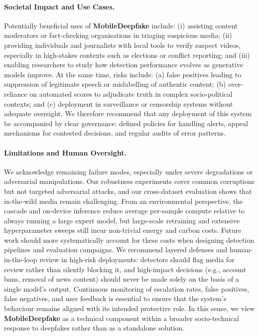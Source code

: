 \paragraph{Societal Impact and Use Cases.} Potentially beneficial uses of \textbf{MobileDeepfake} include: (i) assisting content moderators or fact\hyp checking organisations in triaging suspicious media; (ii) providing individuals and journalists with local tools to verify suspect videos, especially in high\hyp stakes contexts such as elections or conflict reporting; and (iii) enabling researchers to study how detection performance evolves as generative models improve. At the same time, risks include: (a) false positives leading to suppression of legitimate speech or mislabelling of authentic content; (b) over\hyp reliance on automated scores to adjudicate truth in complex socio\hyp political contexts; and (c) deployment in surveillance or censorship systems without adequate oversight. We therefore recommend that any deployment of this system be accompanied by clear governance: defined policies for handling alerts, appeal mechanisms for contested decisions, and regular audits of error patterns.

\paragraph{Limitations and Human Oversight.} We acknowledge remaining failure modes, especially under severe degradations or adversarial manipulations. Our robustness experiments cover common corruptions but not targeted adversarial attacks, and our cross\hyp dataset evaluation shows that in\hyp the\hyp wild media remain challenging. From an environmental perspective, the cascade and on\hyp device inference reduce average per\hyp sample compute relative to always running a large expert model, but large\hyp scale retraining and extensive hyperparameter sweeps still incur non\hyp trivial energy and carbon costs. Future work should more systematically account for these costs when designing detection pipelines and evaluation campaigns. We recommend layered defenses and human\hyp in\hyp the\hyp loop review in high\hyp risk deployments: detectors should flag media for review rather than silently blocking it, and high\hyp impact decisions (e.g., account bans, removal of news content) should never be made solely on the basis of a single model's output. Continuous monitoring of escalation rates, false positives, false negatives, and user feedback is essential to ensure that the system's behaviour remains aligned with its intended protective role. In this sense, we view \textbf{MobileDeepfake} as a technical component within a broader socio\hyp technical response to deepfakes rather than as a standalone solution.
